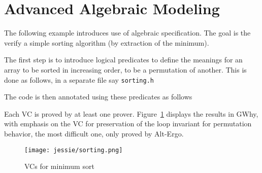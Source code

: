 \documentclass[a4paper,11pt,twoside,openright]{report}
\newcommand{\negtenthspace}{\hspace*{-0.1\linewidth}}
\begin{document}
\section{Advanced Algebraic Modeling}

The following example introduces use of algebraic specification. The
goal is the verify a simple sorting algorithm (by extraction of the
minimum).

The first step is to introduce logical predicates to define the
meanings for an array to be sorted in increasing order, to be a
permutation of another. This is done as follows, in a separate file
say \texttt{sorting.h}



The code is then annotated using these predicates as follows



Each VC is proved by at least one prover. Figure~\ref{fig:sorting}
displays the results in GWhy, with emphasis on the VC for preservation
of the loop invariant for permutation behavior, the most
difficult one, only proved by Alt-Ergo.

\begin{figure}[t]
  \begin{center}
    \negtenthspace\texttt{[image: jessie/sorting.png]}
  \end{center}
  \caption{VCs for minimum sort}
  \label{fig:sorting}
  \hrulefill
\end{figure}





\end{document}
